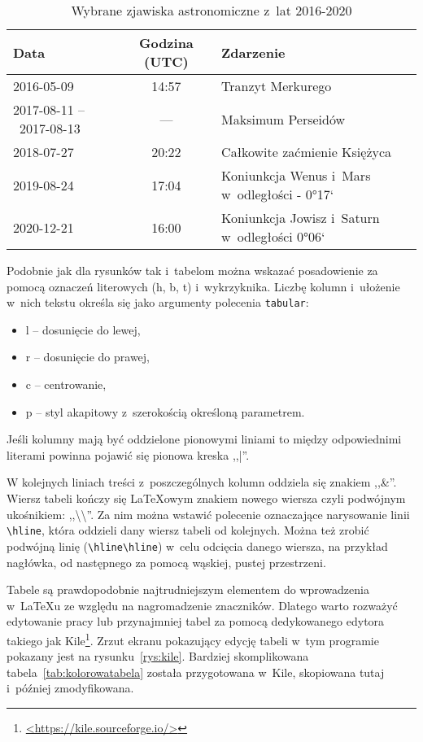 \begin{table}[h]
 \centering
  \begin{tabular}{p{2.5cm}c|l}
    Data        &   Godzina (UTC)   &   Zdarzenie\\\hline\hline
    2016-05-09  &   14:57           &   Tranzyt Merkurego\\\hline
    2017-08-11 --~2017-08-13  & --- &   Maksimum Perseidów \\\hline
    2018-07-27  &   20:22           &   Całkowite zaćmienie Księżyca\\\hline
    2019-08-24  &   17:04           &   Koniunkcja Wenus i~Mars w~odległości - 0°17`\\\hline
    2020-12-21  &   16:00           &   Koniunkcja Jowisz i~Saturn w~odległości 0°06`
  \end{tabular}
 \caption{\label{tab:zjawiska}Wybrane zjawiska astronomiczne z~lat 2016-2020}
\end{table}

Podobnie jak dla rysunków tak i~tabelom można wskazać posadowienie za pomocą oznaczeń literowych (h, b, t) i~wykrzyknika. Liczbę kolumn i~ułożenie w~nich tekstu określa się jako argumenty polecenia \texttt{tabular}:
\begin{itemize}
    \item l -- dosunięcie do lewej,
    \item r -- dosunięcie do prawej,
    \item c -- centrowanie,
    \item p -- styl akapitowy z~szerokością określoną parametrem.
\end{itemize}
Jeśli kolumny mają być oddzielone pionowymi liniami to między odpowiednimi literami powinna pojawić się pionowa kreska ,,|''.

W kolejnych liniach treści z~poszczególnych kolumn oddziela się znakiem ,,\&''. Wiersz tabeli kończy się {\LaTeX}owym znakiem nowego wiersza czyli podwójnym ukośnikiem: ,,\textbackslash\textbackslash''. Za nim można wstawić polecenie oznaczające narysowanie linii \texttt{\textbackslash{}hline}, która oddzieli dany wiersz tabeli od kolejnych. Można też zrobić podwójną linię (\texttt{\textbackslash{}hline\textbackslash{}hline}) w~celu odcięcia danego wiersza, na przykład nagłówka, od następnego za pomocą wąskiej, pustej przestrzeni.

Tabele są prawdopodobnie najtrudniejszym elementem do wprowadzenia w~\LaTeX{u} ze względu na nagromadzenie znaczników. Dlatego warto rozważyć edytowanie pracy lub przynajmniej tabel za pomocą dedykowanego edytora takiego jak Kile\footnote{\href{https://kile.sourceforge.io/}{<https://kile.sourceforge.io/>}}. Zrzut ekranu pokazujący edycję tabeli w~tym programie pokazany jest na rysunku~\ref{rys:kile}.
Bardziej skomplikowana tabela~\ref{tab:kolorowatabela} została przygotowana w~Kile, skopiowana tutaj i~później zmodyfikowana.

